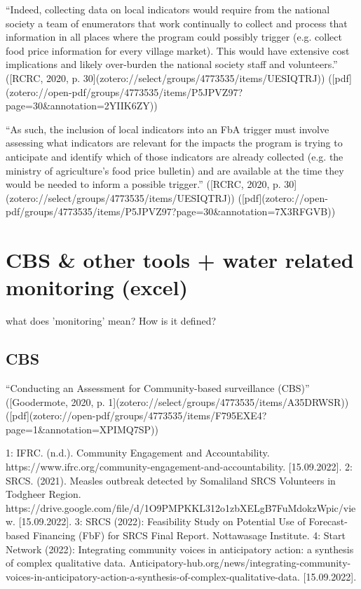 {“Indeed, collecting data on local indicators would require from the national society a team of enumerators that work continually to collect and process that information in all places where the program could possibly trigger (e.g. collect food price information for every village market). This would have extensive cost implications and likely over-burden the national society staff and volunteers.” ([RCRC, 2020, p. 30](zotero://select/groups/4773535/items/UESIQTRJ)) ([pdf](zotero://open-pdf/groups/4773535/items/P5JPVZ97?page=30&annotation=2YIIK6ZY))

“As such, the inclusion of local indicators into an FbA trigger must involve assessing what indicators are relevant for the impacts the program is trying to anticipate and identify which of those indicators are already collected (e.g. the ministry of agriculture's food price bulletin) and are available at the time they would be needed to inform a possible trigger.” ([RCRC, 2020, p. 30](zotero://select/groups/4773535/items/UESIQTRJ)) ([pdf](zotero://open-pdf/groups/4773535/items/P5JPVZ97?page=30&annotation=7X3RFGVB))




\section{CBS & other tools + water related monitoring (excel)}

what does 'monitoring' mean? How is it defined?

\subsection{CBS}

“Conducting an Assessment for Community-based surveillance (CBS)” ([Goodermote, 2020, p. 1](zotero://select/groups/4773535/items/A35DRWSR)) ([pdf](zotero://open-pdf/groups/4773535/items/F795EXE4?page=1&annotation=XPIMQ7SP))

1: IFRC. (n.d.). Community Engagement and Accountability. https://www.ifrc.org/community-engagement-and-accountability. [15.09.2022].
2: SRCS. (2021). Measles outbreak detected by Somaliland SRCS Volunteers in Todgheer Region. https://drive.google.com/file/d/1O9PMPKKL312o1zbXELgB7FuMdokzWpic/view. [15.09.2022].
3: SRCS (2022): Feasibility Study on Potential Use of Forecast-based Financing (FbF) for SRCS Final Report. Nottawasage Institute.
4: Start Network (2022): Integrating community voices in anticipatory action: a synthesis of complex qualitative data. Anticipatory-hub.org/news/integrating-community-voices-in-anticipatory-action-a-synthesis-of-complex-qualitative-data. [15.09.2022].

}
